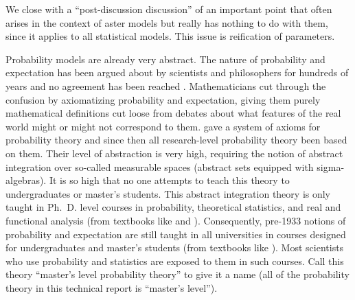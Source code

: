 \documentclass[11pt]{article}
\begin{document}
We close with a ``post-discussion discussion'' of an important point that often
arises in the context of aster models but really has nothing to do with them,
since it applies to all statistical models.  This issue is reification
of parameters.

Probability models are already very abstract.  The nature of probability
and expectation has been argued about by scientists and philosophers for
hundreds of years and no agreement has been reached \citep{hajek}.
Mathematicians cut
through the confusion by axiomatizing probability and expectation, giving
them purely mathematical definitions cut loose from debates about what features
of the real world might or might not correspond to them.
\citet{kolmogorov-foundations} gave a system of axioms for probability theory
and since then all research-level probability theory been based on them.
Their level of abstraction is very high, requiring the notion of abstract
integration over so-called measurable spaces (abstract sets equipped with
sigma-algebras).  It is so high that no one attempts to teach this theory
to undergraduates or master's students.  This abstract integration theory
is only taught in Ph.~D. level courses in probability, theoretical statistics,
and real and functional analysis (from textbooks like \citealp{fristedt}
and \citealp{rudin}).  Consequently, pre-1933 notions of
probability and expectation are still taught in all universities in courses
designed for undergraduates and master's students
(from textbooks like \citealp{casella}).  Most scientists who use
probability and statistics are exposed to them in such courses.
Call this theory ``master's level probability theory'' to give it a name
(all of the probability theory in this technical report is ``master's level'').
\end{document}
